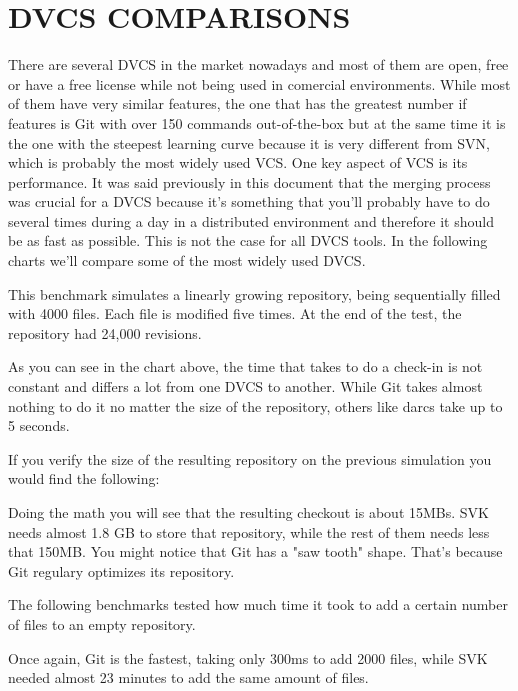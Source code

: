 \section{DVCS COMPARISONS}
There are several DVCS in the market nowadays and most of them are open, free or have a free license while not being used in comercial environments. While most of them have very similar features, the one that has the greatest number if features is Git with over 150 commands out-of-the-box but at the same time it is the one with the steepest learning curve because it is very different from SVN, which is probably the most widely used VCS. 
One key aspect of VCS is its performance. It was said previously in this document that the merging process was crucial for a DVCS because it's something that you'll probably have to do several times during a day in a distributed environment and therefore it should be as fast as possible. This is not the case for all DVCS tools. In the following charts\cite{dvcsperfcomparison} we'll compare some of the most widely used DVCS. 

This benchmark simulates a linearly growing repository, being sequentially filled with 4000 files. Each file is modified five times. At the end of the test, the repository had 24,000 revisions. 


As you can see in the chart above, the time that takes to do a check-in is not constant and differs a lot from one DVCS to another. While Git takes almost nothing to do it no matter the size of the repository, others like darcs take up to 5 seconds.

If you verify the size of the resulting repository on the previous simulation you would find the following:


Doing the math you will see that the resulting checkout is about 15MBs. SVK needs almost 1.8 GB to store that repository, while the rest of them needs less that 150MB. You might notice that Git has a "saw tooth" shape. That's because Git regulary optimizes its repository. 

The following benchmarks tested how much time it took to add a certain number of files to an empty repository. 


Once again, Git is the fastest, taking only 300ms to add 2000 files, while SVK needed almost 23 minutes to add the same amount of files. 

